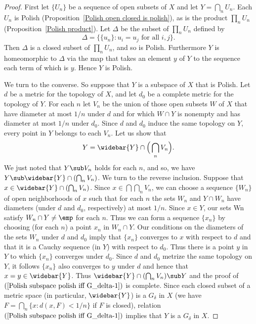 \begin{proof}
First let $\{U_n\}$ be a sequence of open subsets of $X$ and let $Y=\bigcap_nU_n$. Each $U_n$ is Polish (Proposition~\ref{Polish open closed is polish}), as is the product $\prod_nU_n$ (Proposition~\ref{Polish product}). Let $\Delta$ be the subset of $\prod_nU_n$ defined by
\[\Delta=\{\{u_n\}:u_i=u_j\text{ for all $i,j$}\}.\]
Then $\Delta$ is a closed subset of $\prod_nU_n$, and so is Polish. Furthermore $Y$ is homeomorphic to $\Delta$ via the map that takes an element $y$ of $Y$ to the sequence each term of which is $y$. Hence $Y$ is Polish.\par
We turn to the converse. So suppose that $Y$ is a subspace of $X$ that is Polish. Let $d$ be a metric for the topology of $X$, and let $d_0$ be a complete metric for the topology of $Y$. For each $n$ let $V_n$ be the union of those open subsets $W$ of $X$ that have diameter at most $1/n$ under $d$ and for which $W\cap Y$ is nonempty and has diameter at most $1/n$ under $d_0$. Since $d$ and $d_0$ induce the same topology on $Y$, every point in $Y$ belongs to each $V_n$. Let us show that
\begin{align}\label{Polish subspace polish iff G_delta-1}
Y=\widebar{Y}\cap\Big(\bigcap_nV_n\Big).
\end{align}
We just noted that $Y\sub V_n$ holds for each $n$, and so, we have $Y\sub\widebar{Y}\cap(\bigcap_nV_n)$. We turn to the reverse inclusion. Suppose that $x\in\widebar{Y}\cap(\bigcap_nV_n)$. Since $x\in\bigcap\bigcap_nV_n$, we can choose a sequence $\{W_n\}$ of open neighborhoods of $x$ such that for each $n$ the sets $W_n$ and $Y\cap W_n$ have diameters (under $d$ and $d_0$, respectively) at most $1/n$. Since $x
\in Y$, our sets Wn satisfy $W_n\cap Y\neq\emp$ for each $n$. Thus we can form a sequence $\{x_n\}$ by choosing (for each $n$) a point $x_n$ in $W_n\cap Y$. Our conditions on the diameters of the sets $W_n$ under $d$ and $d_0$ imply that $\{x_n\}$ converges to $x$ with respect to $d$ and that it is a Cauchy sequence (in $Y$) with respect to $d_0$. Thus there is a point $y$ in $Y$ to which $\{x_n\}$ converges under $d_0$. Since $d$ and $d_0$ metrize the same topology on $Y$, it follows $\{x_n\}$ also converges to $y$ under $d$ and hence that $x=y\in\widebar{Y}$. Thus $\widebar{Y}\cap(\bigcap_nV_n)\sub Y$ and the proof of $(\ref{Polish subspace polish iff G_delta-1})$ is complete. Since each closed subset of a metric space (in particular, $\widebar{Y}$) is a $G_\delta$ in $X$ (we have $F=\bigcap_n\{x:d(x,F)<1/n\}$ if $F$ is closed), relation $(\ref{Polish subspace polish iff G_delta-1})$ implies that $Y$ is a $G_\delta$ in $X$.
\end{proof}
